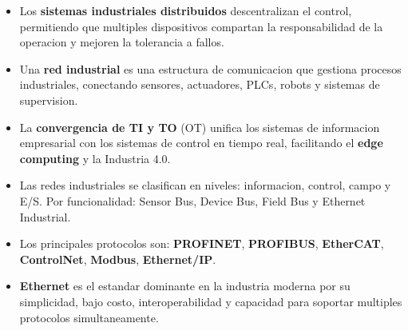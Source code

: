 \begin{itemize}
    \item Los \textbf{sistemas industriales distribuidos} descentralizan el control,
    permitiendo que multiples dispositivos compartan la responsabilidad de la
    operacion y mejoren la tolerancia a fallos.
    \item Una \textbf{red industrial} es una estructura de comunicacion que gestiona
    procesos industriales, conectando sensores, actuadores, PLCs, robots y
    sistemas de supervision.
    \item La \textbf{convergencia de TI y TO} (OT) unifica los sistemas de informacion
    empresarial con los sistemas de control en tiempo real, facilitando el
    \textbf{edge computing} y la Industria 4.0.
    \item Las redes industriales se clasifican en niveles: informacion, control,
    campo y E/S. Por funcionalidad: Sensor Bus, Device Bus, Field Bus y
    Ethernet Industrial.
    \item Los principales protocolos son: \textbf{PROFINET}, \textbf{PROFIBUS},
    \textbf{EtherCAT}, \textbf{ControlNet}, \textbf{Modbus}, \textbf{Ethernet/IP}.
    \item \textbf{Ethernet} es el estandar dominante en la industria moderna por su
    simplicidad, bajo costo, interoperabilidad y capacidad para soportar
    multiples protocolos simultaneamente.
\end{itemize}
